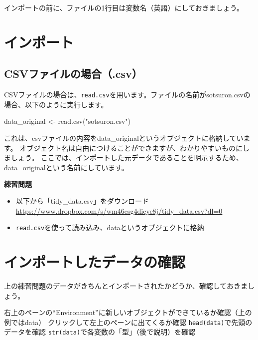 \documentclass[
]{book}
\newenvironment{Shaded}{\begin{snugshade}}{\end{snugshade}}
\newcommand{\FunctionTok}[1]{\textcolor[rgb]{0.00,0.00,0.00}{#1}}
\newcommand{\NormalTok}[1]{#1}
\newcommand{\OtherTok}[1]{\textcolor[rgb]{0.56,0.35,0.01}{#1}}
\newcommand{\StringTok}[1]{\textcolor[rgb]{0.31,0.60,0.02}{#1}}
\providecommand{\tightlist}{%
  \setlength{\itemsep}{0pt}\setlength{\parskip}{0pt}}
\begin{document}
インポートの前に、ファイルの1行目は変数名（英語）にしておきましょう。

\hypertarget{ux30a4ux30f3ux30ddux30fcux30c8}{%
\section{インポート}\label{ux30a4ux30f3ux30ddux30fcux30c8}}

\hypertarget{csvux30d5ux30a1ux30a4ux30ebux306eux5834ux5408.csv}{%
\subsection{CSVファイルの場合（.csv）}\label{csvux30d5ux30a1ux30a4ux30ebux306eux5834ux5408.csv}}

CSVファイルの場合は、\texttt{read.csv}を用います。ファイルの名前がsotsuron.csvの場合、以下のように実行します。

\begin{Shaded}
\begin{Highlighting}[]
\NormalTok{data\_original }\OtherTok{\textless{}{-}} \FunctionTok{read.csv}\NormalTok{(}\StringTok{"sotsuron.csv"}\NormalTok{)}
\end{Highlighting}
\end{Shaded}

これは、csvファイルの内容をdata\_originalというオブジェクトに格納しています。 オブジェクト名は自由につけることができますが、わかりやすいものにしましょう。 ここでは、インポートした元データであることを明示するため、data\_originalという名前にしています。

\textbf{練習問題}

\begin{itemize}
\tightlist
\item
  以下から「tidy\_data.csv」をダウンロード
  \url{https://www.dropbox.com/s/wm46esg4dicye8j/tidy_data.csv?dl=0}\\
\item
  \texttt{read.csv}を使って読み込み、dataというオブジェクトに格納
\end{itemize}

\hypertarget{ux30a4ux30f3ux30ddux30fcux30c8ux3057ux305fux30c7ux30fcux30bfux306eux78baux8a8d}{%
\section{インポートしたデータの確認}\label{ux30a4ux30f3ux30ddux30fcux30c8ux3057ux305fux30c7ux30fcux30bfux306eux78baux8a8d}}

上の練習問題のデータがきちんとインポートされたかどうか、確認しておきましょう。

右上のペーンの``Environment''に新しいオブジェクトができているか確認（上の例ではdata）
クリックして左上のペーンに出てくるか確認
\texttt{head(data)}で先頭のデータを確認
\texttt{str(data)}で各変数の「型」（後で説明）を確認

  
\end{document}
